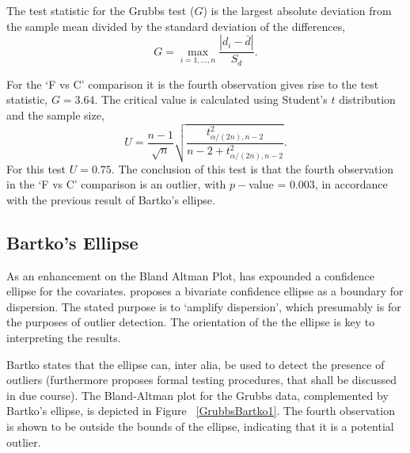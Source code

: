 \documentclass[12pt, a4paper]{report}
\theoremstyle{plain}
\theoremstyle{definition}
\theoremstyle{remark}
\begin{document}
	The test statistic for the Grubbs test ($G$) is the largest
	absolute deviation from the sample mean divided by the standard
	deviation of the differences,
	\begin{equation}
	G =  \displaystyle\max_{i=1,\ldots, n}\frac{\left \vert d_i -
		\bar{d}\right\vert}{S_{d}}.
	\end{equation}
	
	For the `F vs C' comparison it is the fourth observation gives
	rise to the test statistic, $G = 3.64$. The critical value is
	calculated using Student's $t$ distribution and the sample size,
	\[
	U = \frac{n-1}{\sqrt{n}} \sqrt{\frac{t_{\alpha/(2n),n-2}^2}{n - 2
			+ t_{\alpha/(2n),n-2}^2}}.
	\]
	For this test $U = 0.75$. The conclusion of this test is that the fourth observation in the `F vs C' comparison is an outlier, with $p-$value = 0.003, in accordance with the previous result of Bartko's ellipse.
	
	
\newpage
	

		\subsection{Bartko's Ellipse}
		
		As an enhancement on the Bland Altman Plot, \citet{Bartko} has
		expounded a confidence ellipse for the covariates. \citet{Bartko} proposes
		a bivariate confidence ellipse as a boundary for dispersion. The stated purpose is to `amplify dispersion', which presumably is for  the purposes of outlier detection. The orientation of the the ellipse is key to interpreting the results.
		

		
		Bartko states that the ellipse can, inter alia, be used to detect the presence of outliers (furthermore
		\citet{Bartko} proposes formal testing procedures, that shall be discussed in due course). 
		The Bland-Altman plot for the Grubbs data, complemented by Bartko's ellipse, is depicted in Figure ~\ref{GrubbsBartko1}.
		The fourth observation is shown to be outside the bounds of the ellipse, indicating that it is a potential outlier.
		
\end{document}
